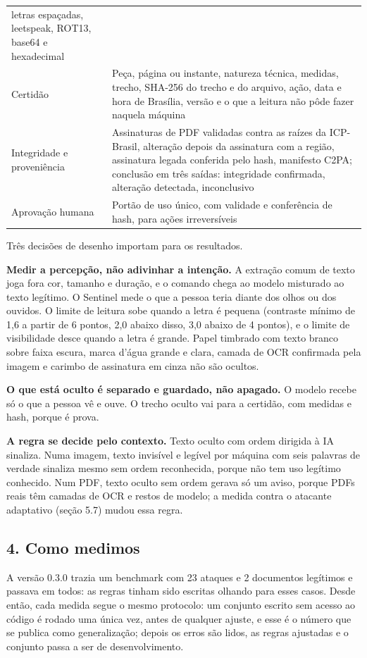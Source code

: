 \documentclass[
  brazilian,
  11pt,
]{article}
\begin{document}
{\begin{longtable}[]{@{}
  >{\raggedright\arraybackslash}p{}
  >{\raggedright\arraybackslash}p{}@{}}
letras espaçadas, leetspeak, ROT13, base64 e hexadecimal \\
Certidão & Peça, página ou instante, natureza técnica, medidas, trecho,
SHA-256 do trecho e do arquivo, ação, data e hora de Brasília, versão e
o que a leitura não pôde fazer naquela máquina \\
Integridade e proveniência & Assinaturas de PDF validadas contra as
raízes da ICP-Brasil, alteração depois da assinatura com a região,
assinatura legada conferida pelo hash, manifesto C2PA; conclusão em três
saídas: integridade confirmada, alteração detectada, inconclusivo \\
Aprovação humana & Portão de uso único, com validade e conferência de
hash, para ações irreversíveis \\
\end{longtable}
}

Três decisões de desenho importam para os resultados.

\textbf{Medir a percepção, não adivinhar a intenção.} A extração comum
de texto joga fora cor, tamanho e duração, e o comando chega ao modelo
misturado ao texto legítimo. O Sentinel mede o que a pessoa teria diante
dos olhos ou dos ouvidos. O limite de leitura sobe quando a letra é
pequena (contraste mínimo de 1,6 a partir de 6 pontos, 2,0 abaixo disso,
3,0 abaixo de 4 pontos), e o limite de visibilidade desce quando a letra
é grande. Papel timbrado com texto branco sobre faixa escura, marca
d'água grande e clara, camada de OCR confirmada pela imagem e carimbo de
assinatura em cinza não são ocultos.

\textbf{O que está oculto é separado e guardado, não apagado.} O modelo
recebe só o que a pessoa vê e ouve. O trecho oculto vai para a certidão,
com medidas e hash, porque é prova.

\textbf{A regra se decide pelo contexto.} Texto oculto com ordem
dirigida à IA sinaliza. Numa imagem, texto invisível e legível por
máquina com seis palavras de verdade sinaliza mesmo sem ordem
reconhecida, porque não tem uso legítimo conhecido. Num PDF, texto
oculto sem ordem gerava só um aviso, porque PDFs reais têm camadas de
OCR e restos de modelo; a medida contra o atacante adaptativo (seção
5.7) mudou essa regra.

\subsection{4. Como medimos}\label{como-medimos}

A versão 0.3.0 trazia um benchmark com 23 ataques e 2 documentos
legítimos e passava em todos: as regras tinham sido escritas olhando
para esses casos. Desde então, cada medida segue o mesmo protocolo: um
conjunto escrito sem acesso ao código é rodado uma única vez, antes de
qualquer ajuste, e esse é o número que se publica como generalização;
depois os erros são lidos, as regras ajustadas e o conjunto passa a ser
de desenvolvimento.
\end{document}
